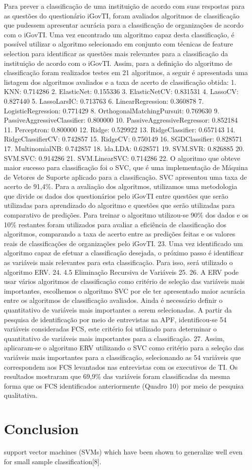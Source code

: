 Para prever a classificação de uma instituição de acordo com suas respostas para as questões do questionário iGovTI, foram avaliados algoritmos de classificação que pudessem apresentar acurácia para a classificação de organizações de acordo com o iGovTI. Uma vez encontrado um algoritmo capaz desta classificação, é possível utilizar o algoritmo selecionado em conjunto com técnicas de feature selection para identificar as questões mais relevantes para a classificação da instituição de acordo com o iGovTI.
Assim, para a definição do algoritmo de classificação foram realizados testes em 21 algoritmos, a seguir é apresentada uma listagem dos algoritmos avaliados e a taxa de acerto de classificação obtida: 
1. KNN: 0.714286
2. ElasticNet: 0.155336
3. ElasticNetCV: 0.831531
4. LassoCV: 0.827440
5. LassoLarsIC: 0.713763
6. LinearRegression: 0.360878
7. LogisticRegression: 0.771429
8. OrthogonalMatchingPursuit: 0.769630
9. PassiveAggressiveClassifier: 0.800000
10. PassiveAggressiveRegressor: 0.852184
11. Perceptron: 0.800000
12. Ridge: 0.529922
13. RidgeClassifier: 0.657143
14. RidgeClassifierCV: 0.742857
15. RidgeCV: 0.750149
16. SGDClassifier: 0.828571
17. MultinomialNB: 0.742857
18. lda.LDA: 0.628571
19. SVM.SVR: 0.826885
20. SVM.SVC: 0.914286
21. SVM.LinearSVC: 0.714286
22. O algoritmo que obteve maior sucesso para classificação foi o SVC, que é uma implementação de Máquina de Vetores de Suporte aplicado para a classificação. SVC apresentou uma taxa de acerto de 91,4\%. Para a avaliação dos algoritmos, utilizamos uma metodologia que divide os dados dos questionários pelo iGovTI entre questões que serão utilizadas para aprendizado do algoritmo e questões que serão utilizadas para comparativo de predições. Para treinar o algoritmo utilizou-se 90\% dos dados e os 10\% restantes foram utilizados para avaliar a eficiência de classificação dos algoritmos, comparando a taxa de acerto entre as predições feitas e os valores reais de classificações de organizações pelo iGovTI. 
23. Uma vez identificado um algoritmo capaz de efetuar a classificação desejada, o próximo passo é identificar as variáveis mais relevantes para esta classificação. Para isso, será utilizado o algoritmo ERV. 
24. 
4.5 Eliminação Recursiva de Variáveis
25. 
26. A ERV pode usar vários algoritmos de classificação como critério de seleção das variáveis mais importantes, escolhemos o algoritmo SVC por ele ter apresentado maior acurácia entre os algoritmos de classificação avaliados. Ainda é necessário definir o quantitativo de variáveis mais importantes a serem selecionadas. A partir da pesquisa de identificação por meio de entrevistas na APF, identificou-se 54 variáveis consideradas FCS, este critério foi utilizado para determinar o quantitativo de variáveis mais importantes para a classificação.
27. Assim, aplicaram-se o algoritmo ERV utilizando o SVC como critério para a seleção das variáveis mais importantes para a classificação, selecionando as 54 variáveis que correspondem aos FCS levantados nas entrevistas com os executivos de TI. Os resultados mostraram que 69,9\% das variáveis foram classificadas da mesma forma que os FCS identificados anteriormente (Quadro 10) por meio de pesquisa qualitativa.

\section{Conclusion}

support vector machines (SVMs) which have been shown to generalize well even for small sample classification[8].